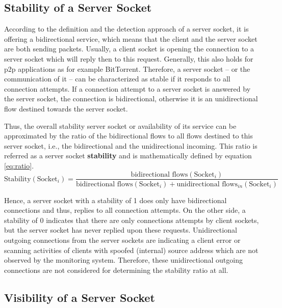 \subsection{Stability of a Server Socket}
According to the definition and the detection approach of a \gls{server socket}, it is offering a bidirectional service, which means that the client and the \gls{server socket} are both sending packets. 
Usually, a client socket is opening the connection to a \gls{server socket} which will reply then to this request. 
Generally, this also holds for \gls{p2p} applications as for example BitTorrent. Therefore, a \gls{server socket} -- or the communication of it -- can be characterized as stable if it responds to all connection attempts. 
If a connection attempt to a \gls{server socket} is answered by the \gls{server socket}, the connection is bidirectional, otherwise it is an unidirectional flow destined towards the \gls{server socket}.

Thus, the overall stability \gls{server socket} or availability of its service can be approximated by the ratio of the bidirectional flows to all flows destined to this \gls{server socket}, i.e., the bidirectional and the unidirectional incoming. 
This ratio is referred as a \gls{server socket} \textbf{stability} and is mathematically defined by equation \ref{eq:ratio}.
\begin{equation}
	\text{Stability}(\text{Socket}_i) = \frac{\text{bidirectional flows}(\text{Socket}_i)}{\text{bidirectional flows}(\text{Socket}_i) + \text{unidirectional flows}_{in}(\text{Socket}_i)}
	\label{eq:ratio}
\end{equation}

Hence, a \gls{server socket} with a stability of 1 does only have bidirectional connections and thus, replies to all connection attempts. 
On the other side, a stability of 0 indicates that there are only connections attempts by client sockets, but the \gls{server socket} has never replied upon these requests. 
Unidirectional outgoing connections from the \glspl{server socket} are indicating a client error or scanning activities of clients with spoofed (internal) source address which are not observed by the monitoring system. 
Therefore, these unidirectional outgoing connections are not considered for determining the stability ratio at all.

\subsection{Visibility of a Server Socket\label{subsection:visibility}}

